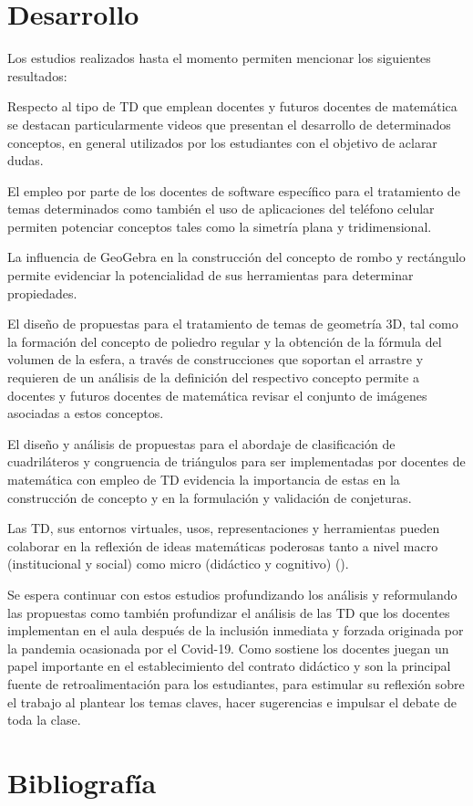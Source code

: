 \documentclass[oneside,spanish]{amsart}
\numberwithin{equation}{section}
\numberwithin{figure}{section}
\theoremstyle{definition}
\begin{document}
\section{Desarrollo}

Los estudios realizados hasta el momento permiten mencionar los siguientes resultados:

Respecto al tipo de TD que emplean docentes y futuros docentes de matemática se destacan particularmente videos que presentan el desarrollo de determinados conceptos, en general utilizados por los estudiantes con el objetivo de aclarar dudas.

El empleo por parte de los docentes de software específico para el tratamiento de temas determinados como también el uso de aplicaciones del teléfono celular permiten potenciar conceptos tales como la simetría plana y tridimensional. 

La influencia de GeoGebra en la construcción del concepto de rombo y rectángulo permite evidenciar la potencialidad de sus herramientas para determinar propiedades. 

El diseño de propuestas para el tratamiento de temas de geometría 3D, tal como la formación del concepto de poliedro regular y la obtención de la fórmula del volumen de la esfera, a través de construcciones que soportan el arrastre y requieren de un análisis de la definición del respectivo concepto permite a docentes y futuros docentes de matemática revisar el conjunto de imágenes asociadas a estos conceptos.

El diseño y análisis de propuestas para el abordaje de clasificación de cuadriláteros y congruencia de triángulos para ser implementadas por docentes de matemática con empleo de TD evidencia la importancia de estas en la construcción de concepto y en la formulación y validación de conjeturas. 

Las TD, sus entornos virtuales, usos, representaciones y herramientas pueden colaborar en la reflexión de ideas matemáticas poderosas tanto a nivel macro (institucional y social) como micro (didáctico y cognitivo) (\citet{palmas18}).

Se espera continuar con estos estudios profundizando los análisis y reformulando las propuestas como también profundizar el análisis de las TD que los docentes implementan en el aula después de la inclusión inmediata y forzada originada por la pandemia ocasionada por el Covid-19. Como sostiene \citet{shahmohammadi19} los docentes juegan un papel importante en el establecimiento del contrato didáctico y son la principal fuente de retroalimentación para los estudiantes, para estimular su reflexión sobre el trabajo al plantear los temas claves, hacer sugerencias e impulsar el debate de toda la clase.

\section{Bibliografía}

\nocite{*}
\printbibliography
\end{document}
